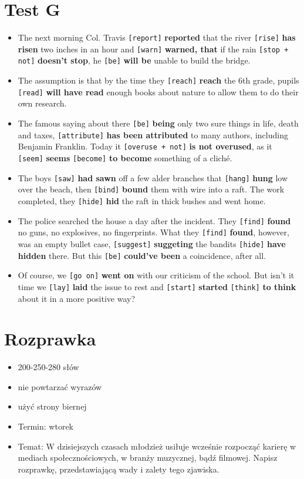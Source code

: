 \documentclass[a4paper]{article}
\begin{document}
\section{Test G}
\begin{itemize}
    \item The next morning Col. Travis {\tt [report]} {\bf reported} that the river {\tt [rise]} {\bf has risen} two inches in an hour and {\tt [warn]} {\bf warned, that} if the rain {\tt [stop + not]} {\bf doesn't stop}, he {\tt [be]} {\bf will be} unable to build the bridge.
    \item The assumption is that by the time they {\tt [reach]} {\bf reach} the 6th grade, pupils {\tt [read]} {\bf will have read} enough books about nature to allow them to do their own research.
    \item The famous saying about there {\tt [be]} {\bf being} only two sure things in life, death and taxes, {\tt [attribute]} {\bf has been attributed} to many authors, including Benjamin Franklin. Today it {\tt [overuse + not]} {\bf is not overused}, as it {\tt [seem]} {\bf seems} {\tt [become]} {\bf to become} something of a clich\'e.
    \item The boys {\tt [saw]} {\bf had sawn} off a few alder branches that {\tt [hang]} {\bf hung} low over the beach, then {\tt [bind]} {\bf bound} them with wire into a raft. The work completed, they {\tt [hide]} {\bf hid} the raft in thick bushes and went home.
    \item The police searched the house a day after the incident. They {\tt [find]} {\bf found} no guns, no explosives, no fingerprints. What they {\tt [find]} {\bf found}, however, was an empty bullet case, {\tt [suggest]} {\bf suggeting} the bandits {\tt [hide]} {\bf have hidden} there. But this {\tt [be]} {\bf could've been} a coincidence, after all.
    \item Of course, we {\tt [go on]} {\bf went on} with our criticism of the school. But isn't it time we {\tt [lay]} {\bf laid} the issue to rest and {\tt [start]} {\bf started} {\tt [think]} {\bf to think} about it in a more positive way?
\end{itemize}
\section*{Rozprawka}
\begin{itemize}
    \item 200-250-280 słów
    \item nie powtarzać wyrazów
    \item użyć strony biernej
    \item Termin: wtorek
    \item Temat: W dzisiejszych czasach młodzież usiłuje wcześnie rozpocząć karierę w mediach społecznościowych, w branży muzycznej, bądź filmowej. Napisz rozprawkę, przedstawiającą wady i zalety tego zjawiska.
\end{itemize}
\end{document}
